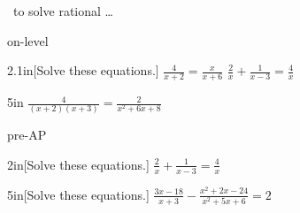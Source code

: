 \begin{myConceptSteps}{%
    ~to solve rational \dots}
\end{myConceptSteps}


\begin{taggedblock}{on-level}
    \begin{my2Problems}{2.1in}[Solve these equations.]
        {
            $
            \frac{4}{x+2}  
            =  
            \frac{x}{x+6}
            $
        }
        {
            $
            \frac{2}{x}  
            +
            \frac{1}{x-3}
            =  
            \frac{4}{x}
            $
        }
    \end{my2Problems}
    \begin{myWideProblem}{5in}
        {
            $
            \frac{4}{(x+2)(x+3)}  
            =  
            \frac{2}{x^2+6x+8}
            $
        }
    \end{myWideProblem}
\end{taggedblock}
\begin{taggedblock}{pre-AP}
    \begin{myWideProblem}{2in}[Solve these equations.]
        {
            $
            \frac{2}{x}  
            +
            \frac{1}{x-3}
            =  
            \frac{4}{x}
            $
        }
    \end{myWideProblem}
    \begin{myWideProblem}{5in}[Solve these equations.]
        {
            $
            \frac{3x-18}{x+3}  
            -
            \frac{x^2+2x-24}{x^2+5x+6}  
            =  
            2
            $
        }
    \end{myWideProblem}
\end{taggedblock}
